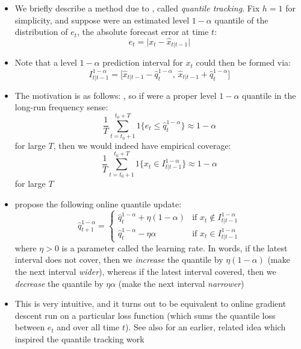 \documentclass{article}
\begin{document}
\begin{itemize}
\item We briefly describe a method due to \citet{angelopoulos2023conformal},
  called \emph{quantile tracking}. Fix $h=1$ for simplicity, and suppose
   were an estimated level $1-\alpha$ quantile of
  the distribution of $e_t$, the absolute forecast error at time $t$:   
  \[
  e_t = \big| x_t - \hat{x}_{t|t-1} \big|
  \]

\item Note that a level $1-\alpha$ prediction interval for $x_t$ could then be
  formed via: 
  \[
  I^{1-\alpha}_{t|t-1} = \big[ \hat{x}_{t|t-1} - \hat{q}^{1-\alpha}_t, \,
  \hat{x}_{t|t-1} + \hat{q}^{1-\alpha}_t \big]
  \]

\item The motivation is as follows: , so if  were a
  proper level $1-\alpha$ quantile in the long-run frequency sense:
  \[
  \frac{1}{T} \sum_{t=t_0+1}^{t_0+T} 1 \big\{ e_t \leq \hat{q}^{1-\alpha}_t
  \big\} \approx 1-\alpha
  \]
  for large $T$,  then we would indeed have empirical coverage: 
  \[
  \frac{1}{T} \sum_{t=t_0+1}^{t_0+T} 1 \big\{ x_t \in
    I^{1-\alpha}_{t|t-1} \big\} \approx 1-\alpha
  \]
  for large $T$

\item \citet{angelopoulos2023conformal} propose the following online quantile 
  update: 
  \[
  \hat{q}^{1-\alpha}_{t+1} =
  \begin{cases}
  \hat{q}^{1-\alpha}_t + \eta (1-\alpha) & \text{if $x_t \notin
    I^{1-\alpha}_{t|t-1}$} \\ 
  \hat{q}^{1-\alpha}_t - \eta \alpha & \text{if $x_t \in I^{1-\alpha}_{t|t-1}$}  
  \end{cases}
  \]
  where $\eta > 0$ is a parameter called the learning rate. In words, if the
  latest interval does not cover, then we \emph{increase} the quantile by 
  $\eta(1-\alpha)$ (make the next interval \emph{wider}), whereas if the latest 
  interval covered, then we \emph{decrease} the quantile by $\eta\alpha$ (make
  the next interval \emph{narrower})

\item This is very intuitive, and it turns out to be equivalent to online
  gradient descent run on a particular loss function (which sums the quantile
  loss between $e_t$ and  over all time $t$). See
  also \citet{gibbs2021adaptive} for an earlier, related idea which inspired the
  quantile tracking work


\end{itemize}
\end{document}
